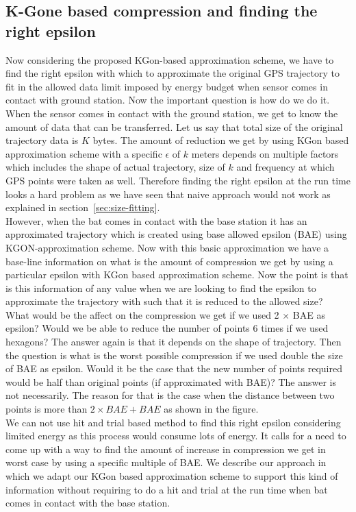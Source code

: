 \documentclass[conference]{IEEEtran}
\begin{document}
\subsection{K-Gone based compression and finding the right epsilon}

Now considering the proposed KGon-based approximation scheme, we have to find the right epsilon with which to approximate the original GPS trajectory to fit in the allowed data limit imposed by energy budget when sensor comes in contact with ground station. Now the important question is how do we do it. When the sensor comes in contact with the ground station, we get to know the amount of data that can be transferred. Let us say that total size of the original trajectory data is $K$ bytes. The amount of reduction we get by using KGon based approximation scheme with a specific $\epsilon$ of $k$ meters depends on multiple factors which includes the shape of actual trajectory, size of $k$ and frequency at which GPS points were taken as well. Therefore finding the right epsilon at the run time looks a hard problem as we have seen that naive approach would not work as explained in section~\ref{sec:size-fitting}.\\

However, when the bat comes in contact with the base station it has an approximated trajectory which is created using base allowed epsilon (BAE) using KGON-approximation scheme. Now with this basic approximation we have a base-line information on what is the amount of compression we get by using a particular epsilon with KGon based approximation scheme. Now the point is that is this information of any value when we are looking to find the epsilon to approximate the trajectory with such that it is reduced to the allowed size?\\

What would be the affect on the compression we get if we used 2 $\times$ BAE as epsilon? Would we be able to reduce the number of points 6 times if we used hexagons? The answer again is that it depends on the shape of trajectory. Then the question is what is the worst possible compression if we used double the size of BAE as epsilon. Would it be the case that the new number of points required would be half than original points (if approximated with BAE)? The answer is not necessarily. The reason for that is the case when the distance between two points is more than $2\times BAE+BAE$ as shown in the figure.\\

We can not use hit and trial based method to find this right epsilon considering limited energy as this process would consume lots of energy. It calls for a need to come up with a way to find the amount of increase in compression we get in worst case by using a specific multiple of BAE. We describe our approach in which we adapt our KGon based approximation scheme to support this kind of information without requiring to do a hit and trial at the run time when bat comes in contact with the base station.
\end{document}
